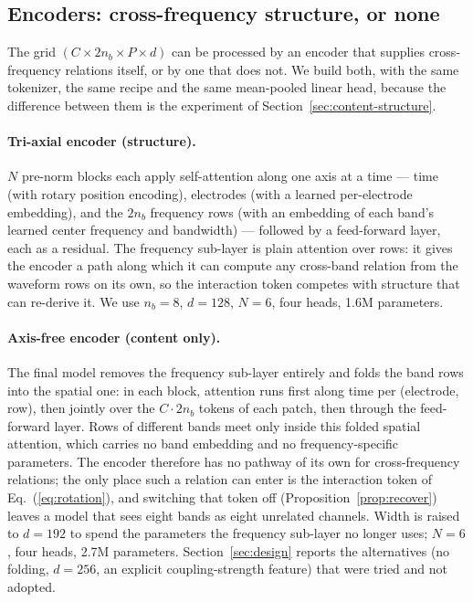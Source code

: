 \subsection{Encoders: cross-frequency structure, or none}
\label{sec:encoder}

The grid $(C \times 2n_b \times P \times d)$ can be processed by an encoder
that supplies cross-frequency relations itself, or by one that does not.
We build both, with the same tokenizer, the same recipe and the same
mean-pooled linear head, because the difference between them is the
experiment of Section~\ref{sec:content-structure}.

\paragraph{Tri-axial encoder (structure).}
$N$ pre-norm blocks each apply self-attention along one axis at a time ---
time (with rotary position encoding), electrodes (with a learned
per-electrode embedding), and the $2n_b$ frequency rows (with an embedding
of each band's learned center frequency and bandwidth) --- followed by a
feed-forward layer, each as a residual. The frequency sub-layer is plain
attention over rows: it gives the encoder a path along which it can
compute any cross-band relation from the waveform rows on its own, so the
interaction token competes with structure that can re-derive it. We use
$n_b{=}8$, $d{=}128$, $N{=}6$, four heads, 1.6M parameters.

\paragraph{Axis-free encoder (content only).}
The final model removes the frequency sub-layer entirely and folds the band
rows into the spatial one: in each block, attention runs first along time
per (electrode, row), then jointly over the $C \cdot 2n_b$ tokens of each
patch, then through the feed-forward layer. Rows of different bands meet
only inside this folded spatial attention, which carries no band
embedding and no frequency-specific parameters. The encoder therefore has
no pathway of its own for cross-frequency relations; the only place such a
relation can enter is the interaction token of Eq.~(\ref{eq:rotation}),
and switching that token off (Proposition~\ref{prop:recover}) leaves a
model that sees eight bands as eight unrelated channels. Width is raised
to $d{=}192$ to spend the parameters the frequency sub-layer no longer
uses; $N{=}6$, four heads, 2.7M parameters. Section~\ref{sec:design}
reports the alternatives (no folding, $d{=}256$, an explicit
coupling-strength feature) that were tried and not adopted.

